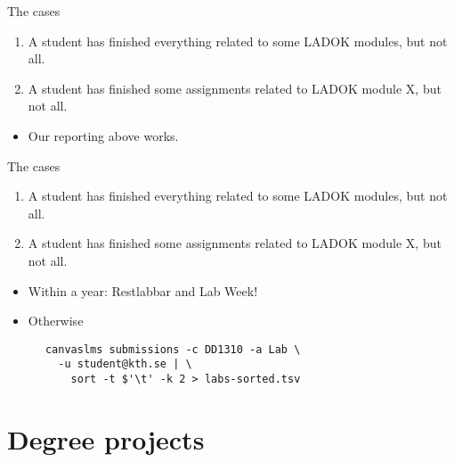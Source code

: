 \begin{frame}[fragile]
  \begin{block}{The cases}
    \begin{enumerate}
      \item A student has finished everything related to some LADOK modules, 
        but not all.
      \item A student has finished some assignments related to LADOK module X, 
        but not all.
    \end{enumerate}
  \end{block}

  \begin{solution}[Case 1]
    \begin{itemize}
      \item Our reporting above works.
    \end{itemize}
  \end{solution}
\end{frame}

\begin{frame}[fragile]
  \begin{block}{The cases}
    \begin{enumerate}
      \item A student has finished everything related to some LADOK modules, 
        but not all.
      \item A student has finished some assignments related to LADOK module X, 
        but not all.
    \end{enumerate}
  \end{block}

  \begin{solution}[Case 2]
    \begin{itemize}
      \item Within a year: Restlabbar and Lab Week!
      \item Otherwise
    \end{itemize}
    \begin{verbatim}
      canvaslms submissions -c DD1310 -a Lab \
        -u student@kth.se | \
          sort -t $'\t' -k 2 > labs-sorted.tsv
    \end{verbatim}
  \end{solution}
\end{frame}


\section{Degree projects}

